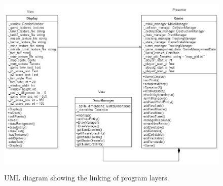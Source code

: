 \documentclass[10pt,a4paper]{report}
\begin{document}
\begin{figure}[h]
		\includegraphics[keepaspectratio=true, scale=0.53]{uml-linking-layers}
	\label{top}
	\caption{UML diagram showing the linking of program layers.}
	\setcounter{figure}{0}
\end{figure}
\end{document}
